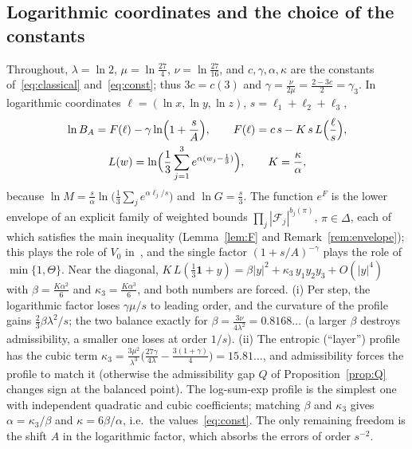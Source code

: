 \documentclass[11pt]{article}
\theoremstyle{definition}
\numberwithin{equation}{section}
\newcommand{\one}{\mathbf 1}
\newcommand{\cF}{\mathcal F}
\begin{document}
\subsection{Logarithmic coordinates and the choice of the constants}\label{sec:why}
Throughout, $\lambda=\ln2$, $\mu=\ln\frac{27}4$, $\nu=\ln\frac{27}{16}$, and $c,\gamma,\alpha,\kappa$ are the constants
of~\eqref{eq:classical} and~\eqref{eq:const}; thus $3c=c(3)$ and $\gamma=\frac\nu{2\mu}=\frac{2-3c}2=\gamma_3$. In logarithmic
coordinates $\ell=(\ln x,\ln y,\ln z)$, $s=\ell_1+\ell_2+\ell_3$,
\begin{gather*}
\ln B_A=F(\ell)-\gamma\ln\Bigl(1+\frac sA\Bigr),\qquad F(\ell)=c\,s-K\,s\,L\Bigl(\frac\ell s\Bigr),\\
L(w)=\ln\Bigl(\frac13\sum_{j=1}^3e^{\alpha(w_j-\frac13)}\Bigr),\qquad K=\frac\kappa\alpha ,
\end{gather*}
because $\ln M=\frac s\alpha\ln\bigl(\frac13\sum_je^{\alpha\ell_j/s}\bigr)$ and $\ln G=\frac s3$. The function $e^F$ is the lower
envelope of an explicit family of weighted bounds $\prod_j|\cF_j|^{b_j(\pi)}$, $\pi\in\Delta$, each of which satisfies the
main inequality (Lemma~\ref{lem:F} and Remark~\ref{rem:envelope}); this plays the role of $V_0$ in~\cite{P}, and the single factor
$(1+s/A)^{-\gamma}$ plays the role of $\min\{1,\Theta\}$. Near the diagonal,
$K\,L(\frac13\one+y)=\beta|y|^2+\kappa_3\,y_1y_2y_3+O(|y|^4)$ with $\beta=\frac{K\alpha^2}6$ and $\kappa_3=\frac{K\alpha^3}6$, and
both numbers are forced. (i) Per step, the logarithmic factor loses $\gamma\mu/s$ to leading order, and the curvature of the
profile gains $\frac23\beta\lambda^2/s$; the two balance exactly for $\beta=\frac{3\nu}{4\lambda^2}=0.8168\ldots$ (a larger
$\beta$ destroys admissibility, a smaller one loses at order $1/s$). (ii) The entropic (``layer'') profile has the cubic term
$\kappa_3=\frac{3\mu^2}{\lambda^3}\bigl(\frac{27\gamma}{4\lambda}-\frac{3(1+\gamma)}4\bigr)=15.81\ldots$, and admissibility forces
the profile to match it (otherwise the admissibility gap $Q$ of Proposition~\ref{prop:Q} changes sign at the balanced point).
The log-sum-exp profile is the simplest one with independent quadratic and cubic coefficients; matching $\beta$ and $\kappa_3$
gives $\alpha=\kappa_3/\beta$ and $\kappa=6\beta/\alpha$, i.e.\ the values~\eqref{eq:const}. The only remaining freedom is the
shift $A$ in the logarithmic factor, which absorbs the errors of order $s^{-2}$.
\end{document}
